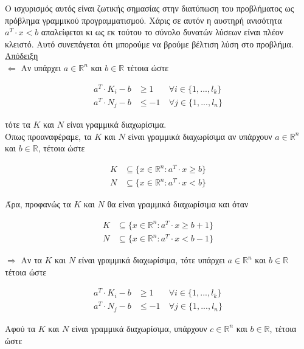 \documentclass[12pt]{article}
\newcommand{\R}{\mathbb{R}}
\begin{document}
Ο ισχυρισμός αυτός είναι ζωτικής σημασίας στην διατύπωση του προβλήματος
ως πρόβλημα γραμμικού προγραμματισμού.
Xάρις σε αυτόν η αυστηρή ανισότητα \( a^{T} \cdot x < b \) απαλείφεται
κι ως εκ τούτου το σύνολο δυνατών λύσεων είναι πλέον κλειστό. Αυτό συνεπάγεται
ότι μπορούμε να βρούμε βέλτιση λύση στο προβλήμα. \\

\underline{Απόδειξη} \\

\( \Leftarrow \) Αν υπάρχει \(a \in \R^{n}\) και \(b \in \R\) τέτοια ώστε

\begin{align*}
    a^{T} \cdot K_{i} -b & \geq 1 & \forall i \in \{1,...,l_{k}\} \\
    a^{T} \cdot N_{j} - b & \leq -1\ & \forall j \in \{1,...,l_{n}\}
\end{align*}

τότε τα \( K \) και \( N \) είναι γραμμικά διαχωρίσιμα. \\

Όπως προαναφέραμε, τα \( K \) και \( N \) είναι γραμμικά διαχωρίσιμα αν υπάρχουν \( a \in \R^{n} \) και \( b \in \R \), τέτοια ώστε

\begin{align*}
K & \subseteq \{ x \in \R^{n} : a^{T} \cdot x \geq b \} \\
N & \subseteq \{ x \in \R^{n} : a^{T} \cdot x < b\}
\end{align*}

Άρα, προφανώς τα \( K \) και \( N \) θα είναι γραμμικά διαχωρίσιμα και όταν

\begin{align*}
K & \subseteq \{ x \in \R^{n} : a^{T} \cdot x \geq b + 1 \} \\
N & \subseteq \{ x \in \R^{n} : a^{T} \cdot x < b - 1\}
\end{align*}

\( \Rightarrow \)  Αν τα \( K \) και \( N \) είναι γραμμικά διαχωρίσιμα, τότε υπάρχει \(a \in \R^{n}\) και \(b \in \R\) τέτοια ώστε

\begin{align*}
    a^{T} \cdot K_{i} -b & \geq 1 & \forall i \in \{1,...,l_{k}\} \\
    a^{T} \cdot N_{j} - b & \leq -1\ & \forall j \in \{1,...,l_{n}\}
\end{align*}

Αφού τα \( K \) και \( N \) είναι γραμμικά διαχωρίσιμα, υπάρχουν \( c \in \R^{n} \) και \( b \in \R \), τέτοια ώστε
\end{document}
